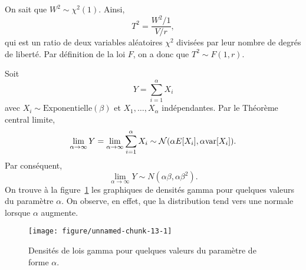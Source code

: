 \begin{solution}{2.16}
    On sait que $W^2 \sim \chi^2(1)$. Ainsi,
    \begin{displaymath}
      T^2 = \frac{W^2/1}{V/r},
    \end{displaymath}
    qui est un ratio de deux variables aléatoires $\chi^2$ divisées
    par leur nombre de degrés de liberté. Par définition de la loi
    $F$, on a donc que $T^2 \sim F(1, r)$.
  
\end{solution}
\begin{solution}{2.17}
    Soit
    \begin{equation*}
      Y = \sum_{i = 1}^\alpha X_i
    \end{equation*}
    avec $X_i \sim \text{Exponentielle}(\beta)$ et $X_1, \dots,
    X_\alpha$ indépendantes. Par le Théorème central limite,
    \begin{align*}
      \lim_{\alpha \rightarrow \infty} Y =
      \lim_{\alpha  \rightarrow \infty} \sum_{i = 1}^\alpha X_i \sim
      \mathcal{N}(\alpha E [ X_i ], \alpha \mathrm{var} [ X_i ]).
    \end{align*}
    Par conséquent,
    \begin{equation*}
      \lim_{\alpha \rightarrow \infty} Y \sim
      N\left(\alpha\beta, \alpha\beta^2\right).
    \end{equation*}
    On trouve à la figure~\ref{fig:echantillon:gammas} les graphiques
    de densités gamma pour quelques valeurs du paramètre $\alpha$. On
    observe, en effet, que la distribution tend vers une normale
    lorsque $\alpha$ augmente.
    \begin{figure}
      \centering
\begin{knitrout}
\color{fgcolor}
\texttt{[image: figure/unnamed-chunk-13-1]}

\end{knitrout}
      \caption{Densités de lois gamma pour quelques valeurs du
        paramètre de forme $\alpha$.}
      \label{fig:echantillon:gammas}
    \end{figure}
  
\end{solution}
